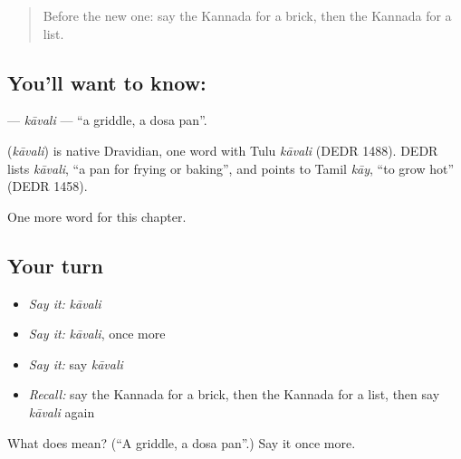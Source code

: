 \label{lesson:KA-C301-kavali}



\begin{quote}
Before the new one: say the Kannada for a brick, then the Kannada for a list.
\end{quote}

\subsection*{You'll want to know: }
\textbf{} — \emph{kāvali} — \textquotedblleft{}a griddle, a dosa pan\textquotedblright{}.

\begin{cousinweb}
\textbf{} (\emph{kāvali}) is native Dravidian, one word with Tulu \emph{kāvali} (DEDR 1488). DEDR lists \emph{kāvali}, \textquotedblleft{}a pan for frying or baking\textquotedblright{}, and points to Tamil \emph{kāy}, \textquotedblleft{}to grow hot\textquotedblright{} (DEDR 1458).
\end{cousinweb}

\begin{grammarlens}[title={What you've built}]
One more word for this chapter.
\end{grammarlens}

\subsection*{Your turn}
\begin{itemize}
\raggedright
  \item \emph{Say it:} \emph{kāvali}
  \item \emph{Say it:} \emph{kāvali}, once more
  \item \emph{Say it:} say \emph{kāvali}
  \item \emph{Recall:} say the Kannada for a brick, then the Kannada for a list, then say \emph{kāvali} again
\end{itemize}

\begin{tcolorbox}[breakable,colback=teal!4,colframe=teal!35!black,title={Before you move on}]
What does  mean? (\textquotedblleft{}A griddle, a dosa pan\textquotedblright{}.) Say it once more.
\end{tcolorbox}
